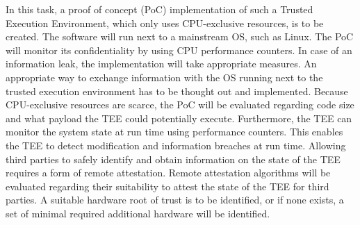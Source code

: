 In this task, a proof of concept (PoC) implementation of such a Trusted
Execution Environment, which only uses CPU-exclusive resources, is to be
created. The software will run next to a mainstream OS, such as Linux. The PoC
will monitor its confidentiality by using CPU performance counters. In case of
an information leak, the implementation will take appropriate measures. An
appropriate way to exchange information with the OS running next to the trusted
execution environment has to be thought out and implemented. Because
CPU-exclusive resources are scarce, the PoC will be evaluated regarding code
size and what payload the TEE could potentially execute. Furthermore, the TEE
can monitor the system state at run time using performance counters. This
enables the TEE to detect modification and information breaches at run time.
Allowing third parties to safely identify and obtain information on the state of
the TEE requires a form of remote attestation. Remote attestation algorithms
will be evaluated regarding their suitability to attest the state of the TEE for
third parties. A suitable hardware root of trust is to be identified, or if none
exists, a set of minimal required additional hardware will be identified.\\
